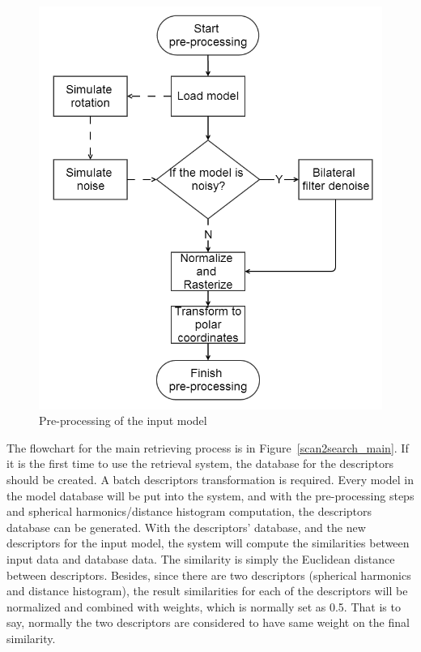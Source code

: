 \begin{figure}[h]
\centering
\includegraphics[width=0.8\linewidth]{scan2search_preprocessing}
\caption{Pre-processing of the input model} \label{scan2search_preprocessing}
\end{figure}

The flowchart for the main retrieving process is in Figure~\ref{scan2search_main}. If it is the first time to use the retrieval system, the database for the descriptors should be created. A batch descriptors transformation is required. Every model in the model database will be put into the system, and with the pre-processing steps and spherical harmonics/distance histogram computation, the descriptors database can be generated. With the descriptors' database, and the new descriptors for the input model, the system will compute the similarities between input data and database data. The similarity is simply the Euclidean distance between
descriptors. Besides, since there are two descriptors (spherical harmonics and distance histogram), the result similarities for each of the descriptors will be normalized and combined with weights, which is normally set as 0.5. That is to say, normally the two descriptors are considered to have same weight on the final similarity.


